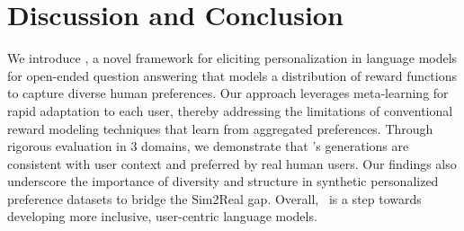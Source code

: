 \vspace{-0.15cm}
\section{Discussion and Conclusion}
\vspace{-0.15cm}

We introduce \methodname, a novel framework for eliciting personalization in language models for open-ended question answering that models a distribution of reward functions to capture diverse human preferences. Our approach leverages meta-learning for rapid adaptation to each user, thereby addressing the limitations of conventional reward modeling techniques that learn from aggregated preferences. Through rigorous evaluation in 3 domains, we demonstrate that \methodname's generations are consistent with user context and preferred by real human users. Our findings also underscore the importance of diversity and structure in synthetic personalized preference datasets to bridge the Sim2Real gap. Overall, \methodname\ is a step towards developing more inclusive, user-centric language models.

